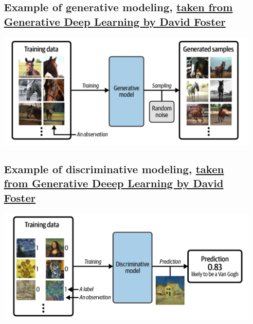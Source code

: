 \documentclass[%
oneside,                 %
final,                   %
10pt]{article}
\begin{document}
\noindent
\subsection{Example of generative modeling, \href{{https://www.oreilly.com/library/view/generative-deep-learning/9781098134174/ch01.html}}{taken from Generative Deep Learning by David Foster}}

\vspace{6mm}

\centerline{\includegraphics[width=1.0\linewidth]{figures/generativelearning.png}}

\vspace{6mm}

\subsection{Example of discriminative modeling, \href{{https://www.oreilly.com/library/view/generative-deep-learning/9781098134174/ch01.html}}{taken from Generative Deeep Learning by David Foster}}

\vspace{6mm}

\centerline{\includegraphics[width=1.0\linewidth]{figures/standarddeeplearning.png}}

\vspace{6mm}
\end{document}
